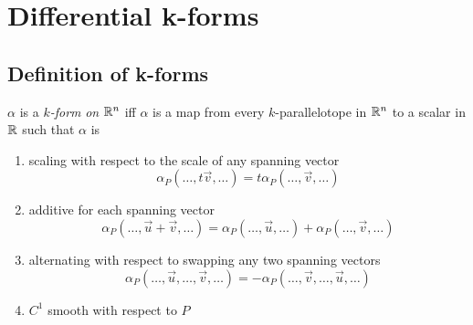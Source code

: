\documentclass[notes]{subfiles}
\begin{document}
\setcounter{section}{6}
\section{Differential k-forms}
\subsection{Definition of k-forms}

\begin{definition}
    $\alpha$ is a \textit{$k$-form} \textit{on} $\mathbb{R}^n$ iff $\alpha$ is a map from every $k$-parallelotope in $\mathbb{R}^n$ to a scalar in $\mathbb{R}$ such that $\alpha$ is
    \begin{enumerate}[label = (\arabic*)]
        \item scaling with respect to the scale of any spanning vector
        \[
            \alpha_P(\ldots, t\vec{v}, \ldots) = t\alpha_P(\ldots, \vec{v}, \ldots)
        \]
        \item additive for each spanning vector
        \[
            \alpha_P(\ldots, \vec{u} + \vec{v}, \ldots) = \alpha_P(\ldots, \vec{u}, \ldots) + \alpha_P(\ldots, \vec{v}, \ldots)
        \]
        \item alternating with respect to swapping any two spanning vectors
        \[
            \alpha_P(\ldots, \vec{u}, \ldots, \vec{v}, \ldots) = -\alpha_P(\ldots, \vec{v}, \ldots, \vec{u}, \ldots)
        \]
        \item $C^1$ smooth with respect to $P$
    \end{enumerate}
\end{definition}
\end{document}
